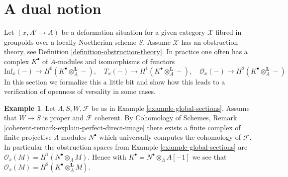 \documentclass{stacks-project}
\theoremstyle{plain}
\theoremstyle{definition}
\newtheorem{example}[subsection]{Example}
\theoremstyle{remark}
\numberwithin{equation}{subsection}
\begin{document}
\section{A dual notion}
\label{section-dual}

\noindent
Let $(x, A' \to A)$ be a deformation situation for a given category
$\mathcal{X}$ fibred in groupoids over a locally Noetherian scheme $S$.
Assume $\mathcal{X}$ has an obstruction theory, see
Definition \ref{definition-obstruction-theory}. In practice
one often has a complex $K^\bullet$ of $A$-modules and isomorphisms of
functors
$$
\text{Inf}_x(-) \to H^0(K^\bullet \otimes_A^\mathbf{L} -),\quad
T_x(-) \to H^1(K^\bullet \otimes_A^\mathbf{L} -),\quad
\mathcal{O}_x(-) \to H^2(K^\bullet \otimes_A^\mathbf{L} -)
$$
In this section we formalize this a little bit and show how this leads
to a verification of openness of versality in some cases.

\begin{example}
\label{example-global-sections-dual}
Let $\Lambda, S, W, \mathcal{F}$ be as in
Example \ref{example-global-sections}.
Assume that $W \to S$ is proper and $\mathcal{F}$ coherent. By
Cohomology of Schemes, Remark
\ref{coherent-remark-explain-perfect-direct-image}
there exists a finite complex of finite projective $\Lambda$-modules
$N^\bullet$ which universally computes the cohomology of $\mathcal{F}$.
In particular the obstruction spaces from Example \ref{example-global-sections}
are $\mathcal{O}_x(M) = H^1(N^\bullet \otimes_\Lambda M)$.
Hence with $K^\bullet = N^\bullet \otimes_\Lambda A[-1]$ we see that
$\mathcal{O}_x(M) = H^2(K^\bullet \otimes_A^\mathbf{L} M)$.
\end{example}
\end{document}
